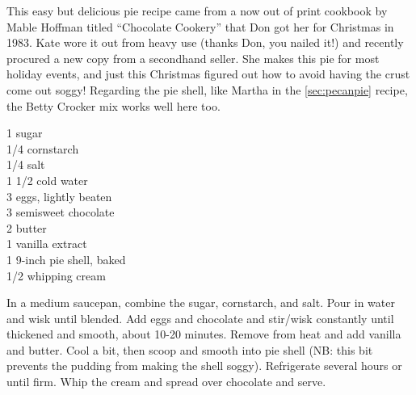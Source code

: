 \begin{open}
This easy but delicious pie recipe came from a now out of print cookbook by Mable Hoffman titled ``Chocolate Cookery'' that Don got her for Christmas in 1983. Kate wore it out from heavy use (thanks Don, you nailed it!) and recently procured a new copy from a secondhand seller. She makes this pie for most holiday events, and just this Christmas figured out how to avoid having the crust come out soggy! Regarding the pie shell, like Martha in the \ref{sec:pecanpie} recipe, the Betty Crocker mix works well here too. 
\end{open}
\begin{ingredients}
    \SI{1}{\cup} sugar\\
    \SI{1/4}{\cup} cornstarch\\
    \SI{1/4}{\teaspoon} salt\\
    1 \SI{1/2}{\cup} cold water\\
    3 eggs, lightly beaten \\
    \SI{3}{\ounce} semisweet chocolate \\
    \SI{2}{\tblspoon} butter \\
    \SI{1}{\teaspoon} vanilla extract\\
    1 9-inch pie shell, baked \\
    \SI{1/2}{\cup} whipping cream \\
\end{ingredients}
    

In a medium saucepan, combine the sugar, cornstarch, and salt. Pour in water and wisk until blended. Add eggs and chocolate and stir/wisk constantly until thickened and smooth, about 10-20 minutes. Remove from heat and add vanilla and butter. Cool a bit, then scoop and smooth into pie shell (NB: this bit prevents the pudding from making the shell soggy). Refrigerate several hours or until firm. Whip the cream and spread over chocolate and serve.